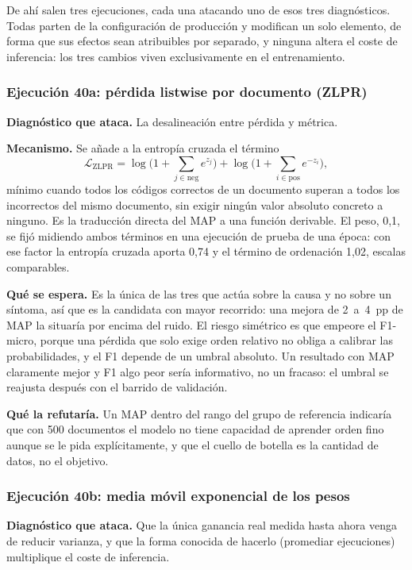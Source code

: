 De ahí salen tres ejecuciones, cada una atacando uno de esos tres diagnósticos. Todas parten de la configuración de producción y modifican un solo elemento, de forma que sus efectos sean atribuibles por separado, y ninguna altera el coste de inferencia: los tres cambios viven exclusivamente en el entrenamiento.

\subsubsection*{Ejecución 40a: pérdida listwise por documento (ZLPR)}

\textbf{Diagnóstico que ataca.} La desalineación entre pérdida y métrica.

\textbf{Mecanismo.} Se añade a la entropía cruzada el término~\cite{su2022zlpr}
\[
\mathcal{L}_{\text{ZLPR}} = \log\Big(1 + \sum_{j \in \text{neg}} e^{z_j}\Big) + \log\Big(1 + \sum_{i \in \text{pos}} e^{-z_i}\Big),
\]
mínimo cuando todos los códigos correctos de un documento superan a todos los incorrectos del mismo documento, sin exigir ningún valor absoluto concreto a ninguno. Es la traducción directa del MAP a una función derivable. El peso, 0{,}1, se fijó midiendo ambos términos en una ejecución de prueba de una época: con ese factor la entropía cruzada aporta 0{,}74 y el término de ordenación 1{,}02, escalas comparables.

\textbf{Qué se espera.} Es la única de las tres que actúa sobre la causa y no sobre un síntoma, así que es la candidata con mayor recorrido: una mejora de 2~a~4~pp de MAP la situaría por encima del ruido. El riesgo simétrico es que empeore el F1-micro, porque una pérdida que solo exige orden relativo no obliga a calibrar las probabilidades, y el F1 depende de un umbral absoluto. Un resultado con MAP claramente mejor y F1 algo peor sería informativo, no un fracaso: el umbral se reajusta después con el barrido de validación.

\textbf{Qué la refutaría.} Un MAP dentro del rango del grupo de referencia indicaría que con 500 documentos el modelo no tiene capacidad de aprender orden fino aunque se le pida explícitamente, y que el cuello de botella es la cantidad de datos, no el objetivo.

\subsubsection*{Ejecución 40b: media móvil exponencial de los pesos}

\textbf{Diagnóstico que ataca.} Que la única ganancia real medida hasta ahora venga de reducir varianza, y que la forma conocida de hacerlo (promediar ejecuciones) multiplique el coste de inferencia.

